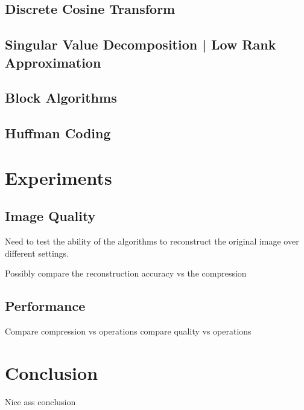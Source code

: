 \documentclass[review,onefignum,onetabnum]{siamart190516}
\begin{document}
\subsection{Discrete Cosine Transform}
\lipsum[15-18]

\subsection{Singular Value Decomposition | Low Rank Approximation}
\lipsum[10-20]

\subsection{Block Algorithms}
\lipsum[21-23]

\subsection{Huffman Coding}
\lipsum[24-25]

\section{Experiments}
\subsection{Image Quality}
Need to test the ability of the algorithms to reconstruct the original image 
over different settings.

Possibly compare the reconstruction accuracy vs the compression

\lipsum[26-30]

\subsection{Performance}
Compare compression vs operations
compare quality vs operations

\lipsum[31-32]

\section{Conclusion}
Nice ass conclusion

\lipsum[33-34]



\end{document}
